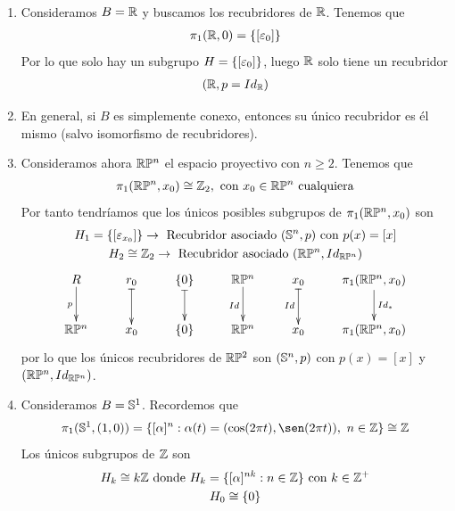 \begin{ejemplo}\
    \begin{enumerate}
        \item Consideramos $B=\mathbb{R}$ y buscamos los recubridores de $\mathbb{R}$. Tenemos que 
        \begin{gather*}
            \pi_1(\mathbb{R},0) = \{[\varepsilon_0]\}
        \end{gather*}
        Por lo que solo hay un subgrupo $H=\{[\varepsilon_0]\}$, luego $\mathbb{R}$ solo tiene un recubridor
        \begin{gather*}
            (\mathbb{R}, p= Id_{\mathbb{R}})
        \end{gather*}

        \item En general, si $B$ es simplemente conexo, entonces su único recubridor es él mismo (salvo isomorfismo de recubridores).
        
        \item Consideramos ahora $\mathbb{R}\mathbb{P}^n$ el espacio proyectivo con $n\geq 2$. Tenemos que
        \begin{gather*}
            \pi_1(\mathbb{R}\mathbb{P}^n, x_0) \cong \mathbb{Z}_2, \text{ con } x_0\in \mathbb{R}\mathbb{P}^n \text{ cualquiera}
        \end{gather*}
        Por tanto tendríamos que los únicos posibles subgrupos de $\pi_1(\mathbb{R}\mathbb{P}^n, x_0)$ son
        \begin{gather*}
            H_1 = \{[\varepsilon_{x_0}]\} \to \text{ Recubridor asociado } (\mathbb{S}^n, p) \text{ con } p(x)=[x]\\
            H_2 \cong \mathbb{Z}_2 \to \text{ Recubridor asociado } (\mathbb{R}\mathbb{P}^n, Id_{\mathbb{R}\mathbb{P}^n})
        \end{gather*}
        \begin{gather*}
            \xymatrix{
                R \ar[d]_p & r_0 \ar@{|->}[d] & \{0\} \ar@{|->}[d] & \bb{R}\bb{P}^n \ar[d]_{Id} & x_0 \ar@{|->}[d]_{Id} & \pi_1(\bb{R}\bb{P}^n, x_0) \ar[d]^{Id_*}\\
                \bb{R}\bb{P}^n & x_0  & \{0\} & \bb{R}\bb{P}^n & x_0 & \pi_1(\bb{R}\bb{P}^n, x_0)
            }
        \end{gather*}
        por lo que los únicos recubridores de $\mathbb{R}\mathbb{P}^2$ son $(\mathbb{S}^n, p)$ con $p(x)=[x]$ y $(\mathbb{R}\mathbb{P}^n, Id_{\mathbb{R}\mathbb{P}^n})$.

        \item Consideramos $B=\mathbb{S}^1$. Recordemos que 
        \begin{gather*}
            \pi_1(\bb{S}^1, (1,0)) = \{[\alpha]^n : \alpha(t) = (\cos(2\pi t), \sen(2\pi t)),\ n\in \bb{Z}\} \cong \bb{Z}
        \end{gather*}
        Los únicos subgrupos de $\mathbb{Z}$ son 
        \begin{gather*}
            H_k \cong k\mathbb{Z} \text{ donde } H_k = \{[\alpha]^{nk} : n\in \mathbb{Z}\} \text{ con } k\in \mathbb{Z}^+\\
            H_0 \cong \{0\}
        \end{gather*}


\end{enumerate}
\end{ejemplo}
